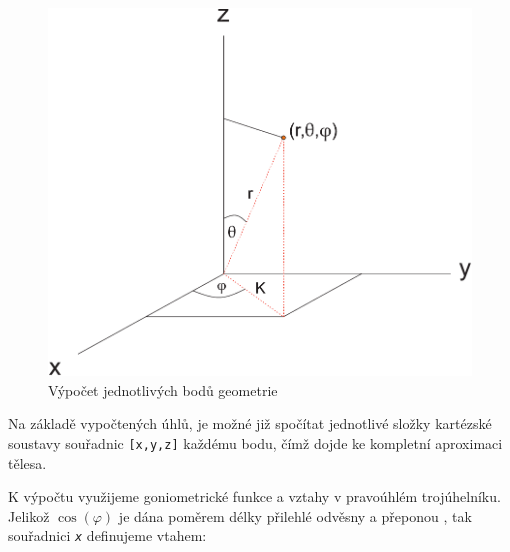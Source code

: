 \begin{figure}[h]
	\label{img:2}
	\centering
	\includegraphics[scale=1.0,angle=0,width=0.6\linewidth]{obrazky-figures/geometry}
	\caption{Výpočet jednotlivých bodů geometrie}
	\label{fig:geom}
\end{figure}
 
Na základě vypočtených úhlů, je možné již spočítat jednotlivé složky kartézské soustavy souřadnic \texttt{[x,y,z]} každému bodu, čímž dojde ke kompletní aproximaci tělesa.

\newpage

K výpočtu využijeme goniometrické funkce  a vztahy v pravoúhlém trojúhelníku. Jelikož $ \cos (\varphi) $ je dána poměrem délky přilehlé odvěsny a přeponou \cite{Goniometrie}, tak souřadnici \texttt{\textit{x}} definujeme vtahem:
 
